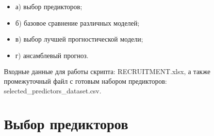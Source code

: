 \documentclass[
  letterpaper,
  DIV=11,
  numbers=noendperiod]{scrreprt}
\begin{document}
\begin{itemize}
\item
  а) выбор предикторов;
\item
  б) базовое сравнение различных моделей;
\item
  в) выбор лучшей прогностической модели;
\item
  г) ансамблевый прогноз.
\end{itemize}

Входные данные для работы скрипта: RECRUITMENT.xlsx, а также
промежуточный файл с готовым набором предикторов:
selected\_predictors\_dataset.csv.

\section{Выбор
предикторов}\label{ux432ux44bux431ux43eux440-ux43fux440ux435ux434ux438ux43aux442ux43eux440ux43eux432}
\end{document}
